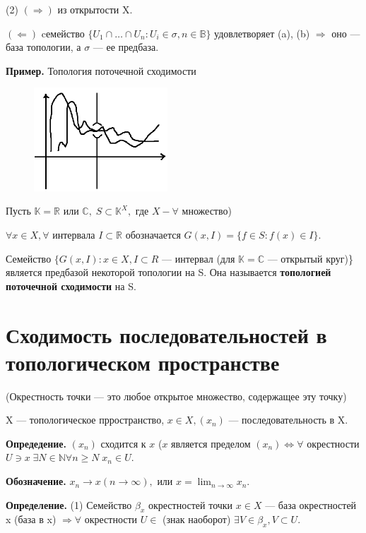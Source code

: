 \documentclass[12pt,a4paper]{article}
\begin{document}
(2) $(\Rightarrow)$ из открытости X. 

$(\Leftarrow)$ cемейство $\{U_{1} \cap \ldots \cap U_{n}: U_{i} \in \sigma, n \in \mathbb{B}\}$ удовлетворяет (a), (b) $\Rightarrow$ оно --- база топологии, а $\sigma$ --- ее предбаза. 

\textbf{Пример.} Топология поточечной сходимости

\begin{figure}
	\includegraphics[width = 5cm]{lect3_3.png}
\end{figure}

Пусть $\mathbb{K} = \mathbb{R}$ или $\mathbb{C}, \; S \subset \mathbb{K}^{X},$ где $X - \forall$ множество) 

$\forall x \in X, \forall$ интервала $I \subset \mathbb{R}$ обозначается $G(x, I) = \{f \in S: f(x) \in I\}.$ 

Семейство $\{G(x, I): x \in X, I \subset R$ --- интервал (для $\mathbb{K} = \mathbb{C}$ --- открытый круг)\} является предбазой некоторой топологии на S. Она называется \textbf{топологией поточечной сходимости} на S. 

\section{Сходимость последовательностей в топологическом пространстве}

(Окрестность точки --- это любое открытое множество, содержащее эту точку)

X --- топологическое прространство, $x \in X, (x_{n})$ --- последовательность в X. 

\textbf{Опредедение.} $(x_{n})$ сходится к $x$ ($x$ является пределом $(x_{n}) \Leftrightarrow \forall$ окрестности $U \ni x \; \exists N \in \mathbb{N} \forall n \geqslant N \; x_{n} \in U.$

\textbf{Обозначение.} $x_{n} \to x (n \to \infty),$ или $x = \lim_{n \to \infty} x_{n}.$ 

\textbf{Определение.} (1) Семейство $\beta_{x}$ окрестностей точки $x \in X$ --- база окрестностей x (база в x) $\Rightarrow \forall$ окрестности $U \in$ (знак наоборот) $\exists V \in \beta_{x}, V \subset U.$
\end{document}

